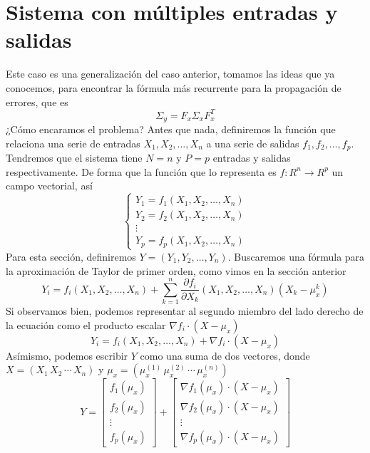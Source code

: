 \documentclass[a4paper, 10pt]{article}
\begin{document}
\section{Sistema con múltiples entradas y salidas}
Este caso es una generalización del caso anterior, tomamos las ideas que ya conocemos, para encontrar la fórmula
más recurrente para la propagación de errores, que es
\begin{equation}
    \Sigma_y = F_x \Sigma_x F_x^{T}
\end{equation}
¿Cómo encaramos el problema? Antes que nada, definiremos la función que relaciona una serie de entradas $X_1,X_2,\dots,X_n$ a una serie de salidas $f_1,f_2,\dots,f_p$.
Tendremos que el sistema tiene $N=n$ y $P=p$ entradas y salidas respectivamente. De forma que la función que lo representa es $f:R^{n} \to R^{p}$ un campo vectorial, así
\begin{equation}
    \begin{cases}
        Y_1 = f_1(X_1,X_2,\dots,X_n) \\
        Y_2 = f_2(X_1,X_2,\dots,X_n) \\
        \vdots                       \\
        Y_p = f_p(X_1,X_2,\dots,X_n)
    \end{cases}
\end{equation}
Para esta sección, definiremos $Y=\left(Y_1,Y_2,\dots,Y_n\right)$.
Buscaremos una fórmula para la aproximación de Taylor de primer orden, como vimos en la sección anterior
\begin{equation}
    Y_i = f_i(X_1,X_2,\dots,X_n) + \sum_{k=1}^{n}{\dfrac{\partial f_i}{\partial X_k}
    \left(X_1,X_2,\dots,X_n\right)\left(X_k - \mu_{x}^{k}\right)}
\end{equation}
Si observamos bien, podemos representar al segundo miembro del lado derecho de la ecuación como
el producto escalar $\nabla f_i \cdot (X-\mu_x)$
\begin{equation}
    Y_i = f_i(X_1,X_2,\dots,X_n) + \nabla f_i \cdot (X-\mu_x)
\end{equation}
Asímismo, podemos escribir $Y$ como una suma de dos vectores, donde $X=\left(X_1\, X_2\, \cdots\, X_n\right)$ y
$\mu_x = \left(\mu_x^{(1)}\,\mu_x^{(2)}\,\cdots\, \mu_x^{(n)}\right)$
\begin{equation}
    Y = \begin{bmatrix}
        f_1(\mu_x) \\
        f_2(\mu_x) \\
        \vdots     \\
        f_p(\mu_x)
    \end{bmatrix} +
    \begin{bmatrix}
        \nabla f_1\left(\mu_x\right) \cdot (X-\mu_x) \\
        \nabla f_2\left(\mu_x\right) \cdot (X-\mu_x) \\
        \vdots                                       \\
        \nabla f_p\left(\mu_x\right) \cdot (X-\mu_x)
    \end{bmatrix}
\end{equation}
\end{document}
